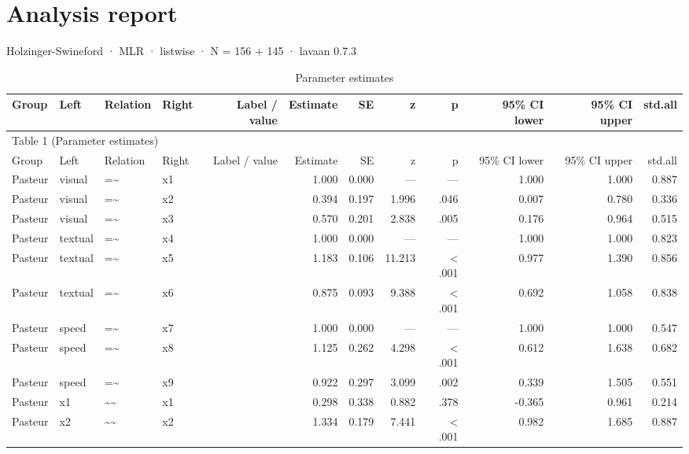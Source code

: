 \documentclass[11pt]{article}
\begin{document}
\section*{Analysis report}
Holzinger-Swineford · MLR · listwise · N = 156 + 145 · lavaan 0.7.3\par

\begin{landscape}
\small
\begin{longtable}{llllrrrrrrrr}
\caption{Parameter estimates}\\
\toprule
Group & Left & Relation & Right & Label / value & Estimate & SE & z & p & 95\% CI lower & 95\% CI upper & std.all \\
\midrule
\endfirsthead
\multicolumn{12}{l}{Table 1 (Parameter estimates)} \\
\toprule
Group & Left & Relation & Right & Label / value & Estimate & SE & z & p & 95\% CI lower & 95\% CI upper & std.all \\
\midrule
\endhead
Pasteur & visual & =\textasciitilde{} & x1 &  & 1.000 & 0.000 & — & — & 1.000 & 1.000 & 0.887 \\
Pasteur & visual & =\textasciitilde{} & x2 &  & 0.394 & 0.197 & 1.996 & .046 & 0.007 & 0.780 & 0.336 \\
Pasteur & visual & =\textasciitilde{} & x3 &  & 0.570 & 0.201 & 2.838 & .005 & 0.176 & 0.964 & 0.515 \\
Pasteur & textual & =\textasciitilde{} & x4 &  & 1.000 & 0.000 & — & — & 1.000 & 1.000 & 0.823 \\
Pasteur & textual & =\textasciitilde{} & x5 &  & 1.183 & 0.106 & 11.213 & < .001 & 0.977 & 1.390 & 0.856 \\
Pasteur & textual & =\textasciitilde{} & x6 &  & 0.875 & 0.093 & 9.388 & < .001 & 0.692 & 1.058 & 0.838 \\
Pasteur & speed & =\textasciitilde{} & x7 &  & 1.000 & 0.000 & — & — & 1.000 & 1.000 & 0.547 \\
Pasteur & speed & =\textasciitilde{} & x8 &  & 1.125 & 0.262 & 4.298 & < .001 & 0.612 & 1.638 & 0.682 \\
Pasteur & speed & =\textasciitilde{} & x9 &  & 0.922 & 0.297 & 3.099 & .002 & 0.339 & 1.505 & 0.551 \\
Pasteur & x1 & \textasciitilde{}\textasciitilde{} & x1 &  & 0.298 & 0.338 & 0.882 & .378 & -0.365 & 0.961 & 0.214 \\
Pasteur & x2 & \textasciitilde{}\textasciitilde{} & x2 &  & 1.334 & 0.179 & 7.441 & < .001 & 0.982 & 1.685 & 0.887 \\

\end{longtable}
\end{landscape}
\end{document}
